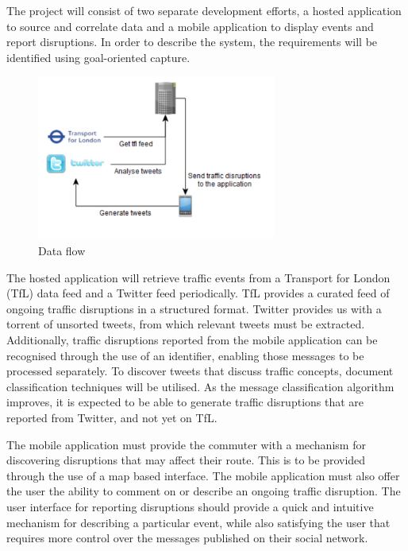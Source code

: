 The project will consist of two separate development efforts, a
hosted application to source and correlate data and a mobile application to
display events and report disruptions. In order to describe the system, the
requirements will be identified using goal-oriented capture\cite{Requirements}.

\begin{figure}[here]
\begin{center}
\includegraphics[width=0.7\textwidth]{images/draft_architecture.pdf}
\end{center}
\vspace{-20pt}
\caption{Data flow}
\end{figure}

The hosted application will retrieve traffic events from a Transport for
London\cite{website:tfl_dev} (TfL) data feed and a Twitter
feed\cite{website:twitter_dev} periodically. TfL provides a curated feed of
ongoing traffic disruptions in a structured format. Twitter provides us with a
torrent of unsorted tweets, from which relevant tweets must be extracted. 
Additionally, traffic disruptions reported from the mobile application can be
recognised through the use of an identifier, enabling those messages to be
processed separately. To discover tweets that discuss traffic concepts,
document classification techniques will be utilised. As the message
classification algorithm improves, it is expected to be able to generate 
traffic disruptions that are reported from Twitter, and not yet on TfL.

The mobile application must provide the commuter with a mechanism for
discovering disruptions that may affect their route. This is to be provided
through the use of a map based interface. The mobile application must also
offer the user the ability to comment on or describe an ongoing traffic
disruption. The user interface for reporting disruptions should provide a quick and
intuitive mechanism for describing a particular event, while also satisfying
the user that requires more control over the messages published on their social
network.

